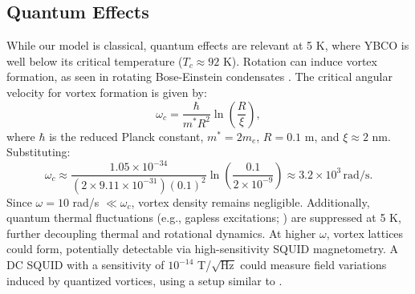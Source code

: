 \documentclass[12pt]{article}
\begin{document}
\subsection{Quantum Effects}
While our model is classical, quantum effects are relevant at 5 K, where YBCO is well below its critical temperature ($T_c \approx 92$ K). Rotation can induce vortex formation, as seen in rotating Bose-Einstein condensates \citep{Anderson1962}. The critical angular velocity for vortex formation is given by:
\begin{equation}
    \omega_c = \frac{\hbar}{m^* R^2} \ln\left(\frac{R}{\xi}\right),
\end{equation}
where $\hbar$ is the reduced Planck constant, $m^* = 2 m_e$, $R = 0.1$ m, and $\xi \approx 2$ nm. Substituting:
\begin{equation}
    \omega_c \approx \frac{1.05 \times 10^{-34}}{(2 \times 9.11 \times 10^{-31})(0.1)^2} \ln\left(\frac{0.1}{2 \times 10^{-9}}\right) \approx 3.2 \times 10^3 \, \text{rad/s}.
\end{equation}
Since $\omega = 10$ rad/s $\ll \omega_c$, vortex density remains negligible. Additionally, quantum thermal fluctuations (e.g., gapless excitations; \citealp{Maki1969}) are suppressed at 5 K, further decoupling thermal and rotational dynamics. At higher $\omega$, vortex lattices could form, potentially detectable via high-sensitivity SQUID magnetometry. A DC SQUID with a sensitivity of $10^{-14}$ T/$\sqrt{\text{Hz}}$ could measure field variations induced by quantized vortices, using a setup similar to \citet{Tajmar2007}.
\end{document}
